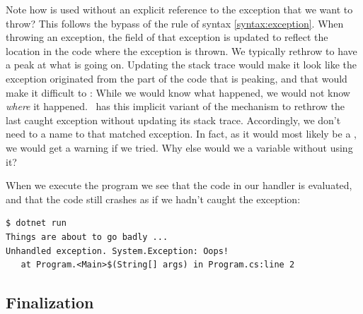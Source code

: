 Note how  is used without an explicit reference to the exception that we want to throw? This follows the bypass of the  rule of syntax \ref{syntax:exception}. When throwing an exception, the  field of that exception is updated to reflect the location in the code where the exception is thrown. We typically rethrow to have a peak at what is going on. Updating the stack trace would make it look like the exception originated from the part of the code that is peaking, and that would make it difficult to : While we would know what happened, we would not know \textsl{where} it happened. \csharp\ has this implicit variant of the  mechanism to rethrow the last caught exception without updating its stack trace. Accordingly, we don't need to  a name to that matched exception. In fact, as it would most likely be a , we would get a warning if we tried. Why else would we  a variable without using it?

When we execute the program we see that the code in our handler is evaluated, and that the code still crashes as if we hadn't caught the exception:
\begin{verbatim}
$ dotnet run
Things are about to go badly ...
Unhandled exception. System.Exception: Oops!
   at Program.<Main>$(String[] args) in Program.cs:line 2
\end{verbatim}

\subsection{Finalization}

